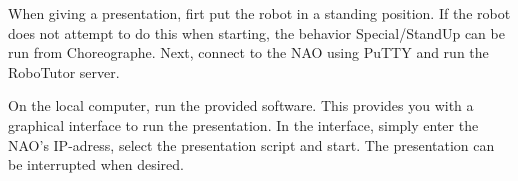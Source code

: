 When giving a presentation, firt put the robot in a standing position. If the robot does not attempt to do this when starting, the behavior Special/StandUp can be run from Choreographe.
Next, connect to the NAO using PuTTY and run the RoboTutor server.


On the local computer, run the provided software. This provides you with a graphical interface to run the presentation. In the interface, simply enter the NAO's IP-adress, select the presentation script and start. The presentation can be interrupted when desired.
